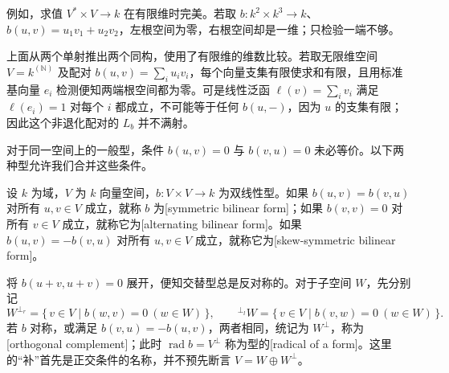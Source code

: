 例如，求值 \(V^*\times V\to k\) 在有限维时完美。若取 \(b:k^2\times k^3\to k\)、\(b(u,v)=u_1v_1+u_2v_2\)，左根空间为零，右根空间却是一维；只检验一端不够。

\ProseParagraphBreak
上面从两个单射推出两个同构，使用了有限维的维数比较。若取无限维空间 \(V=k^{(\mathbb N)}\) 及配对 \(b(u,v)=\sum_i u_iv_i\)，每个向量支集有限使求和有限，且用标准基向量 \(e_i\) 检测便知两端根空间都为零。可是线性泛函 \(\ell(v)=\sum_i v_i\) 满足 \(\ell(e_i)=1\) 对每个 \(i\) 都成立，不可能等于任何 \(b(u,-)\)，因为 \(u\) 的支集有限；因此这个非退化配对的 \(L_b\) 并不满射。

\ProseParagraphBreak
对于同一空间上的一般型，条件 \(b(u,v)=0\) 与 \(b(v,u)=0\) 未必等价。以下两种型允许我们合并这些条件。

\begin{definition}\label{b2:def:symmetric-alternating-form}
	设 \(k\) 为域，\(V\) 为 \(k\) 向量空间，\(b:V\times V\to k\) 为双线性型。如果 \(b(u,v)=b(v,u)\) 对所有 \(u,v\in V\) 成立，就称 \(b\) 为[symmetric bilinear form]；如果 \(b(v,v)=0\) 对所有 \(v\in V\) 成立，就称它为[alternating bilinear form]。如果 \(b(u,v)=-b(v,u)\) 对所有 \(u,v\in V\) 成立，就称它为[skew-symmetric bilinear form]。
\end{definition}

将 \(b(u+v,u+v)=0\) 展开，便知交替型总是反对称的。对于子空间 \(W\)，先分别记
\[
	W^{\perp_r}=\{\,v\in V\mid b(w,v)=0\ (w\in W)\,\},\qquad {}^{\perp_l}W=\{\,v\in V\mid b(v,w)=0\ (w\in W)\,\}.
\]
若 \(b\) 对称，或满足 \(b(v,u)=-b(u,v)\)，两者相同，统记为 \(W^\perp\)，称为[orthogonal complement]；此时 \(\operatorname{rad}b=V^\perp\) 称为型的[radical of a form]。这里的“补”首先是正交条件的名称，并不预先断言 \(V=W\oplus W^\perp\)。

